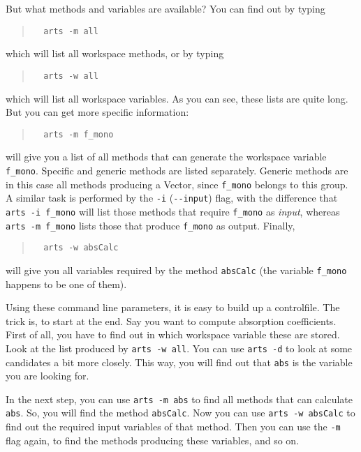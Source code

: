 But what methods and variables are available? You can find out by
typing
\begin{quote}
\begin{verbatim}
  arts -m all
\end{verbatim}
\end{quote}
which will list all workspace methods, or by typing 
\begin{quote}
\begin{verbatim}
  arts -w all
\end{verbatim}
\end{quote}
which will list all workspace variables. As you can see, these lists
are quite long. But you can get more specific information:
\begin{quote}
\begin{verbatim}
  arts -m f_mono
\end{verbatim}
\end{quote}
will give you a list of all methods that can generate the workspace
variable \verb|f_mono|. Specific and generic methods are listed
separately. Generic methods are in this case all methods producing a
Vector, since \verb|f_mono| belongs to this group. A similar task is
performed by the \verb|-i| (\verb|--input|) flag, with the difference
that \verb|arts -i f_mono| will list those methods that require
\verb|f_mono| as \emph{input}, whereas \verb|arts -m f_mono| lists
those that produce \verb|f_mono| as output. Finally,
\begin{quote}
\begin{verbatim}
  arts -w absCalc
\end{verbatim}
\end{quote}
will give you all variables required by the method \verb|absCalc|
(the variable \verb|f_mono| happens to be one of them).

Using these command line parameters, it is easy to build up a
controlfile. The trick is, to start at the end. Say you want to
compute absorption coefficients. First of all, you have to find out
in which workspace variable these are stored. Look at the list
produced by \verb|arts -w all|. You can use \verb|arts -d| to look at
some candidates a bit more closely. This way, you will find out that
\verb|abs| is the variable you are looking for.

In the next step, you can use \verb|arts -m abs| to find all methods
that can calculate \verb|abs|. So, you will find the method
\verb|absCalc|. Now you can use \verb|arts -w absCalc| to find out the
required input variables of that method. Then you can use the
\verb|-m| flag again, to find the methods producing these variables,
and so on.

